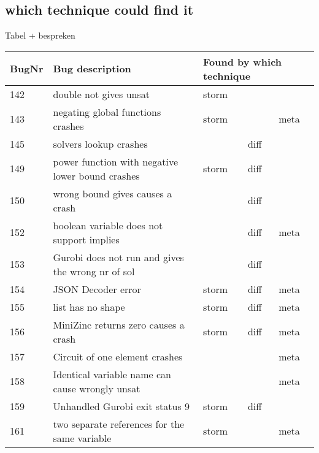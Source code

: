 \subsection{which technique could find it}
Tabel + bespreken
\begin{table}[]
	\centering
	\begin{tabular}{lllll}
		BugNr & Bug description                                           & \multicolumn{3}{l}{Found by which technique} \\ \toprule
		142   & double not gives unsat                                    & storm          &              &              \\
		143   & negating global functions crashes                         & storm          &              & meta         \\
		145   & solvers lookup crashes                                    &                & diff         &              \\
		149   & power function with negative lower bound crashes          & storm          & diff         &              \\
		150   & wrong bound gives causes a crash                          &                & diff         &              \\
		152   & boolean variable does not support implies                 &                & diff         & meta         \\
		153   & Gurobi does not run and gives the wrong nr of sol         &                & diff         &              \\
		154   & JSON Decoder error                                        & storm          & diff         & meta         \\
		155   & list has no shape                                         & storm          & diff         & meta         \\
		156   & MiniZinc returns zero causes a crash                      & storm          & diff         & meta         \\
		157   & Circuit of one element crashes                            &                &              & meta         \\
		158   & Identical variable name can cause wrongly unsat           &                &              & meta         \\
		159   & Unhandled Gurobi exit status 9                            & storm          & diff         &              \\
		161   & two separate references for the same variable             & storm          &              & meta         \\

\end{tabular}
\end{table}
